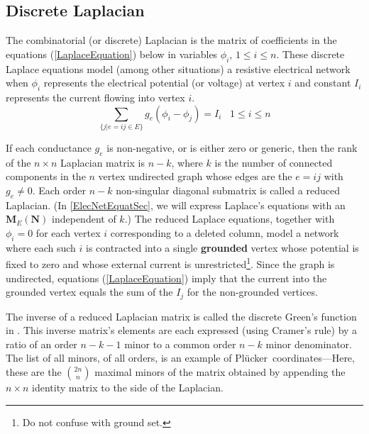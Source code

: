 \documentclass[12pt]{article}
\theoremstyle{definition}
\newcommand{\ext}[1]{\ensuremath{\mathbf{#1}}}
\newcommand{\Plucker}{Pl\"{u}cker\ }
\begin{document}
\subsection{Discrete Laplacian}
\label{Laplacian}
The combinatorial (or discrete) Laplacian
is the matrix of coefficients
in the equations (\ref{LaplaceEquation}) 
below
in variables $\phi_i$, $1\leq i \leq n$.
These discrete Laplace equations model (among other 
situations) a resistive electrical network
when $\phi_i$ represents the electrical potential 
(or voltage) at vertex $i$ and
constant $I_i$ represents the current flowing into
vertex $i$.
\begin{equation}
\label{LaplaceEquation}
\sum_{\{j | e=ij\in E\}}
g_e(\phi_i-\phi_j) = I_i \;\;\; 1\le i \le n
\end{equation}

If each  conductance $g_{e}$ is non-negative, 
or is either zero
or generic, then the rank of 
the $n\times n$ Laplacian matrix is $n-k$, 
where $k$ is the number of connected components in the $n$
vertex undirected graph whose edges
are the $e=ij$ with $g_{e}\neq 0$.  Each order $n-k$ non-singular
diagonal submatrix is called a reduced Laplacian.  
(In \textsection \ref{ElecNetEquatSec}, we will express Laplace's equations
with an $\ext{M}_E(\ext{N})$ independent of $k$.) 
The reduced Laplace 
equations, together with $\phi_i=0$ for each vertex $i$ corresponding
to a deleted column, model a network where each such $i$ is 
contracted into a single 
\textbf{grounded} vertex
whose potential is fixed to zero and whose 
external current is 
unrestricted\footnote{Do not confuse with ground set.}.  
Since the graph is undirected, equations (\ref{LaplaceEquation})
imply that the current into the grounded vertex equals
the sum of the $I_j$ for the non-grounded vertices.

The inverse of a reduced Laplacian matrix is called the
discrete Green's function in \cite{ChungYaoGreens}.
This inverse matrix's elements are each expressed (using Cramer's rule)
by a ratio of an order $n-k-1$ minor to a common order $n-k$ minor
denominator.
The %
list of all minors, of all orders,
is an example of \Plucker coordinates---Here, these are the 
$\binom{2n}{n}$ maximal minors of the matrix obtained by appending
the $n\times n$ identity matrix to the side of the Laplacian.
\end{document}
